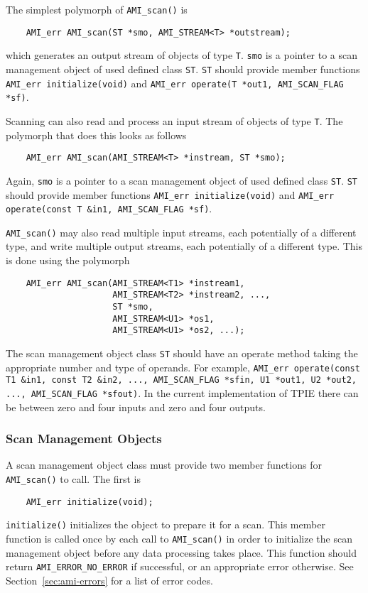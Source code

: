 
The simplest polymorph of \verb|AMI_scan()| is
\begin{verbatim}
    AMI_err AMI_scan(ST *smo, AMI_STREAM<T> *outstream);
\end{verbatim}
which generates an output stream of objects of type \verb|T|.
\verb|smo| is a pointer to a scan management object of used defined
class \verb|ST|.  \verb|ST| should provide member functions {\tt
  AMI\_err initialize(void)} and {\tt AMI\_err operate(T *out1,
  AMI\_SCAN\_FLAG *sf)}.

Scanning can also read and process an input stream of objects of type
\verb|T|.  The polymorph that does this looks as follows
\begin{verbatim}
    AMI_err AMI_scan(AMI_STREAM<T> *instream, ST *smo);
\end{verbatim}
Again, \verb|smo| is a pointer to a scan management object of used
defined class \verb|ST|.  \verb|ST| should provide member functions
{\tt AMI\_err initialize(void)} and {\tt AMI\_err operate(const T
  \&in1, AMI\_SCAN\_FLAG *sf)}.

\verb|AMI_scan()| may also read multiple input streams, each
potentially of a different type, and write multiple output streams,
each potentially of a different type.  This is done using the polymorph
\begin{verbatim}
    AMI_err AMI_scan(AMI_STREAM<T1> *instream1, 
                     AMI_STREAM<T2> *instream2, ..., 
                     ST *smo, 
                     AMI_STREAM<U1> *os1, 
                     AMI_STREAM<U1> *os2, ...);
\end{verbatim}
The scan management object class \verb|ST| should have an operate
method taking the appropriate number and type of operands.  For
example, {\tt AMI\_err operate(const T1 \&in1, const T2 \&in2, ...,
  AMI\_SCAN\_FLAG *sfin, U1 *out1, U2 *out2, ..., AMI\_SCAN\_FLAG
  *sfout)}.  In the current implementation of TPIE there can be
between zero and four inputs and zero and four outputs.


\subsubsection{Scan Management Objects}  

A scan management object class must provide two member functions for
\verb|AMI_scan()| to call. The first is
\begin{verbatim}
    AMI_err initialize(void);
\end{verbatim}
\verb|initialize()| initializes the object to prepare it for a scan.  This
member function is called once by each call to \verb|AMI_scan()| in order
to initialize the scan management object before any data processing takes
place. This function should return \verb|AMI_ERROR_NO_ERROR| if
successful, or an appropriate error otherwise. See
Section~\ref{sec:ami-errors} for a list of error codes.

